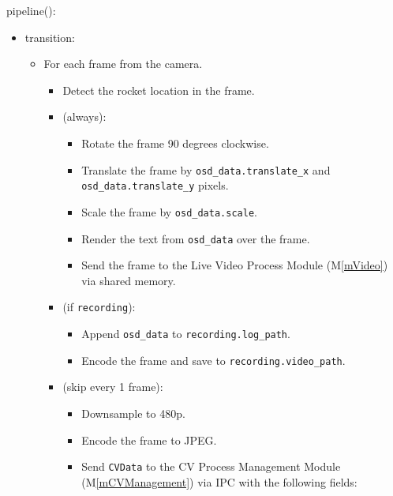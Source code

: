 \documentclass[12pt, titlepage]{article}
\newcommand{\mref}[1]{M\ref{#1}}
\begin{document}
\noindent pipeline():
\begin{itemize}
  \item transition:
        \begin{itemize}
          \item For each frame from the camera.
                \begin{itemize}
                  \item Detect the rocket location in the frame.
                  \item (always):
                        \begin{itemize}
                          \item Rotate the frame 90 degrees clockwise.
                          \item Translate the frame by \texttt{osd\_data.translate\_x} and
                                \texttt{osd\_data.translate\_y} pixels.
                          \item Scale the frame by \texttt{osd\_data.scale}.
                          \item Render the text from \texttt{osd\_data} over the frame.
                          \item Send the frame to the Live Video Process Module (\mref{mVideo}) via shared
                                memory.
                        \end{itemize}
                  \item (if \texttt{recording}):
                        \begin{itemize}
                          \item Append \texttt{osd\_data} to \texttt{recording.log\_path}.
                          \item Encode the frame and save to \texttt{recording.video\_path}.
                        \end{itemize}
                  \item (skip every 1 frame):
                        \begin{itemize}
                          \item Downsample to 480p.
                          \item Encode the frame to JPEG.
                          \item Send \texttt{CVData} to the CV Process Management Module (\mref{mCVManagement})
                                via IPC with the following fields:
                                \begin{itemize}

\end{itemize}
\end{itemize}
\end{itemize}
\end{itemize}
\end{itemize}
\end{document}

